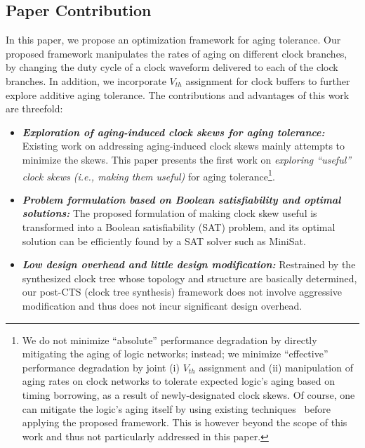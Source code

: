 \subsection{Paper Contribution}
\label{subsec:pc}
In this paper, we propose an optimization framework for aging tolerance. Our proposed framework manipulates the rates of aging on different clock branches, by changing the duty cycle of a clock waveform delivered to each of the clock branches. In addition, we incorporate $V_{th}$ assignment for clock buffers to further explore additive aging tolerance. The contributions and advantages of this work are threefold:




\begin{itemize}
\item \textbf{\textit{Exploration of aging-induced clock skews for aging tolerance:}} Existing work on addressing aging-induced clock skews mainly attempts to minimize the skews. This paper presents the first work on \textit{exploring \enquote{useful} clock skews (i.e., making them useful)} for aging tolerance\footnote[1]{We do not minimize \enquote{absolute} performance degradation by directly mitigating the aging of logic networks; instead; we minimize \enquote{effective} performance degradation by joint (i) $V_{th}$ assignment and (ii) manipulation of aging rates on clock networks to tolerate expected logic's aging based on timing borrowing, as a result of newly-designated clock skews. Of course, one can mitigate the logic's aging itself by using existing techniques~\cite{kumar2007nbti, paul2006temporal, kang2007efficient, yang2007combating} before applying the proposed framework. This is however beyond the scope of this work and thus not particularly addressed in this paper.}.
\item  \textbf{\textit{Problem formulation based on Boolean satisfiability and optimal solutions:}} The proposed formulation of making clock skew useful is transformed into a Boolean satisfiability (SAT) problem, and its optimal solution can be efficiently found by a SAT solver such as MiniSat.
\item \textbf{\textit{Low design overhead and little design modification:}} Restrained by the synthesized clock tree whose topology and structure are basically determined, our post-CTS (clock tree synthesis) framework does not involve aggressive modification and thus does not incur significant design overhead.
\end{itemize}



